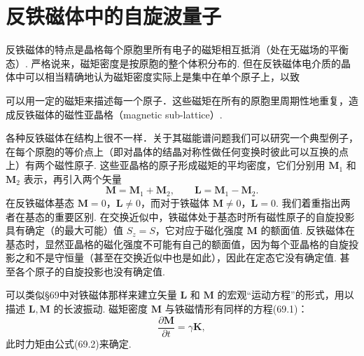 \section{反铁磁体中的自旋波量子}

反铁磁体的特点是晶格每个原胞里所有电子的磁矩相互抵消（处在无磁场的平衡态）. 严格说来，磁矩密度是按原胞的整个体积分布的. 但在反铁磁体电介质的晶体中可以相当精确地认为磁矩密度实际上是集中在单个原子上，以致

可以用一定的磁矩来描述每一个原子．这些磁矩在所有的原胞里周期性地重复，造成反铁磁体的磁性亚晶格（magnetic sub-lattice）.

各种反铁磁体在结构上很不一样．关于其磁能谱问题我们可以研究一个典型例子，在每个原胞的等价点上（即对晶体的结晶对称性做任何变换时彼此可以互换的点上）有两个磁性原子. 这些亚晶格的原子形成磁矩的平均密度，它们分别用 $\bm{M}_1$ 和 $\bm{M}_2$ 表示，再引入两个矢量
\begin{equation}
\bm{M}=\bm{M}_1+\bm{M}_2,\qquad
\bm{L}=\bm{M}_1-\bm{M}_2.
\end{equation}
在反铁磁体基态 $\bm{M}=0$，$\bm{L}\neq0$，而对于铁磁体 $\bm{M}\neq0$，$\bm{L}=0$. 我们着重指出两者在基态的重要区别. 在交换近似中，铁磁体处于基态时所有磁性原子的自旋投影具有确定（的最大可能）值 $S_z=S$，它对应于磁化强度 $\bm{M}$ 的额面值. 反铁磁体在基态时，显然亚晶格的磁化强度不可能有自己的额面值，因为每个亚晶格的自旋投影之和不是守恒量（甚至在交换近似中也是如此），因此在定态它没有确定值. 甚至各个原子的自旋投影也没有确定值.

可以类似§69中对铁磁体那样来建立矢量 $\bm{L}$ 和 $\bm{M}$ 的宏观“运动方程”的形式，用以描述 $\bm{L},\bm{M}$ 的长波振动. 磁矩密度 $\bm{M}$ 与铁磁情形有同样的方程(69.1)：
\begin{equation}
\frac{\partial\bm{M}}{\partial t}=\gamma\bm{K},
\end{equation}
此时力矩由公式(69.2)来确定.

